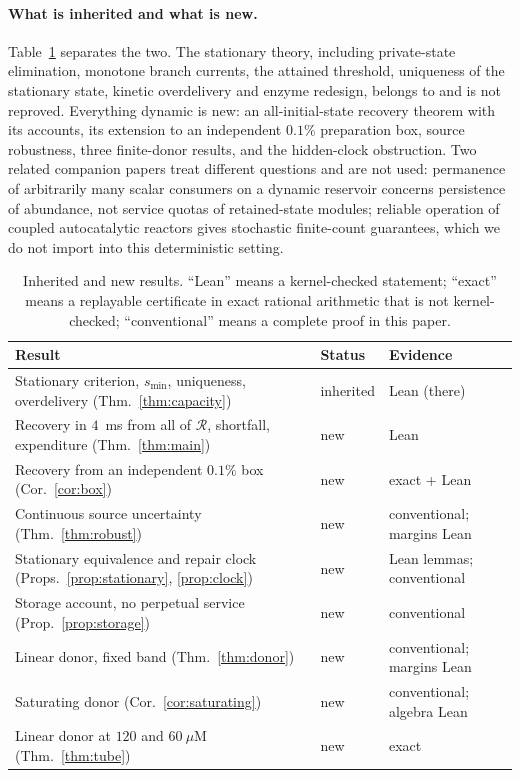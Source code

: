 \documentclass[11pt,a4paper]{article}
\theoremstyle{plain}
\theoremstyle{definition}
\theoremstyle{remark}
\newcommand{\uM}{\ensuremath{\mu\mathrm{M}}}
\newcommand{\RR}{\mathcal R}
\begin{document}
\paragraph{What is inherited and what is new.}
Table~\ref{tab:inherit} separates the two. The stationary theory, including
private-state elimination, monotone branch currents, the attained threshold,
uniqueness of the stationary state, kinetic overdelivery and enzyme redesign,
belongs to \citep{companionNADPH} and is not reproved. Everything dynamic is
new: an all-initial-state recovery theorem with its accounts, its extension to
an independent $0.1\%$ preparation box, source robustness, three finite-donor
results, and the hidden-clock obstruction. Two related companion papers treat
different questions and are not used: permanence of arbitrarily many scalar
consumers on a dynamic reservoir \citep{companionPermanence} concerns
persistence of abundance, not service quotas of retained-state modules;
reliable operation of coupled autocatalytic reactors \citep{companionReliable}
gives stochastic finite-count guarantees, which we do not import into this
deterministic setting.

\begin{table}[t]\centering\small
\caption{Inherited and new results. ``Lean'' means a kernel-checked statement;
``exact'' means a replayable certificate in exact rational arithmetic that is
not kernel-checked; ``conventional'' means a complete proof in this paper.}
\label{tab:inherit}
\begin{tabular}{>{\raggedright\arraybackslash}p{.50\linewidth}>{\raggedright\arraybackslash}p{.20\linewidth}>{\raggedright\arraybackslash}p{.20\linewidth}}
\toprule
Result & Status & Evidence\\\midrule
Stationary criterion, $s_{\min}$, uniqueness, overdelivery (Thm.~\ref{thm:capacity}) & inherited \citep{companionNADPH} & Lean (there)\\
Recovery in $4$~ms from all of $\RR$, shortfall, expenditure (Thm.~\ref{thm:main}) & new & Lean\\
Recovery from an independent $0.1\%$ box (Cor.~\ref{cor:box}) & new & exact + Lean\\
Continuous source uncertainty (Thm.~\ref{thm:robust}) & new & conventional; margins Lean\\
Stationary equivalence and repair clock (Props.~\ref{prop:stationary}, \ref{prop:clock}) & new & Lean lemmas; conventional\\
Storage account, no perpetual service (Prop.~\ref{prop:storage}) & new & conventional\\
Linear donor, fixed band (Thm.~\ref{thm:donor}) & new & conventional; margins Lean\\
Saturating donor (Cor.~\ref{cor:saturating}) & new & conventional; algebra Lean\\
Linear donor at $120$ and $60~\uM$ (Thm.~\ref{thm:tube}) & new & exact\\
\bottomrule
\end{tabular}
\end{table}
\end{document}
